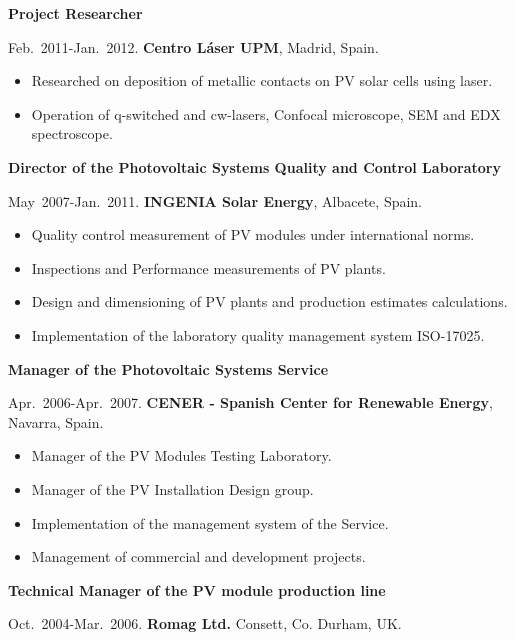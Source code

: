 \documentclass{article}
\begin{document}

{\bf Project Researcher}

\medskip
Feb.~2011-Jan.~2012.
{\bf Centro L\'aser UPM},
Madrid, Spain.

\begin{itemize}\itemsep 0pt
\item Researched on deposition of metallic contacts on PV solar cells using laser.
\item Operation of q-switched and cw-lasers, Confocal microscope, SEM and EDX spectroscope.
\end{itemize}

{\bf Director of the Photovoltaic Systems Quality and Control Laboratory}

\medskip
May~2007-Jan.~2011.
{\bf INGENIA Solar Energy},
Albacete, Spain.

\begin{itemize}\itemsep 0pt
\item Quality control measurement of PV modules under international norms.
\item Inspections and Performance measurements of PV plants.
\item Design and dimensioning of PV plants and production estimates calculations.
\item Implementation of the laboratory quality management system ISO-17025.
\end{itemize}

{\bf Manager of the Photovoltaic Systems Service}

\medskip
Apr.~2006-Apr.~2007.
{\bf CENER - Spanish Center for Renewable Energy},
Navarra, Spain.

\begin{itemize}\itemsep 0pt
\item Manager of the PV Modules Testing Laboratory.
\item Manager of the PV Installation Design group.
\item Implementation of the management system of the Service.
\item Management of commercial and development projects.
\end{itemize}


{\bf Technical Manager of the PV module production line}

\medskip
Oct.~2004-Mar.~2006. 
{\bf Romag Ltd.} 
Consett, Co. Durham, UK.
\end{document}
